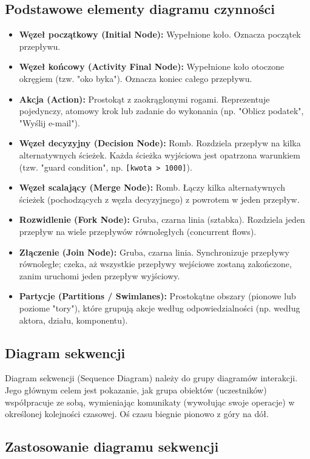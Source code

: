 \documentclass[a4paper,12pt]{article}
\begin{document}
\subsection{Podstawowe elementy diagramu czynności}
\begin{itemize}
    \item \textbf{Węzeł początkowy (Initial Node):} Wypełnione koło. Oznacza początek przepływu.
    \item \textbf{Węzeł końcowy (Activity Final Node):} Wypełnione koło otoczone okręgiem (tzw. "oko byka"). Oznacza koniec całego przepływu.
    \item \textbf{Akcja (Action):} Prostokąt z zaokrąglonymi rogami. Reprezentuje pojedynczy, atomowy krok lub zadanie do wykonania (np. "Oblicz podatek", "Wyślij e-mail").
    \item \textbf{Węzeł decyzyjny (Decision Node):} Romb. Rozdziela przepływ na kilka alternatywnych ścieżek. Każda ścieżka wyjściowa jest opatrzona warunkiem (tzw. "guard condition", np. \texttt{[kwota > 1000]}).
    \item \textbf{Węzeł scalający (Merge Node):} Romb. Łączy kilka alternatywnych ścieżek (pochodzących z węzła decyzyjnego) z powrotem w jeden przepływ.
    \item \textbf{Rozwidlenie (Fork Node):} Gruba, czarna linia (sztabka). Rozdziela jeden przepływ na wiele przepływów równoległych (concurrent flows).
    \item \textbf{Złączenie (Join Node):} Gruba, czarna linia. Synchronizuje przepływy równoległe; czeka, aż wszystkie przepływy wejściowe zostaną zakończone, zanim uruchomi jeden przepływ wyjściowy.
    \item \textbf{Partycje (Partitions / Swimlanes):} Prostokątne obszary (pionowe lub poziome "tory"), które grupują akcje według odpowiedzialności (np. według aktora, działu, komponentu).
\end{itemize}

\subsection{Diagram sekwencji}

Diagram sekwencji (Sequence Diagram) należy do grupy diagramów interakcji. Jego głównym celem jest pokazanie, jak grupa obiektów (uczestników) współpracuje ze sobą, wymieniając komunikaty (wywołując swoje operacje) w określonej kolejności czasowej. Oś czasu biegnie pionowo z góry na dół.

\subsection{Zastosowanie diagramu sekwencji}
\end{document}
